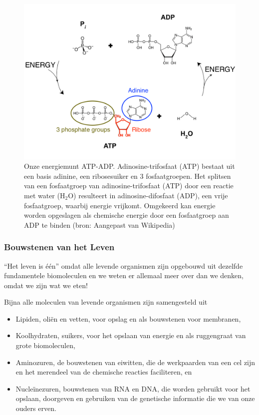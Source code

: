 \documentclass[
  11pt,
]{book}
\providecommand{\tightlist}{%
  \setlength{\itemsep}{0pt}\setlength{\parskip}{0pt}}
\begin{document}
\begin{figure}

{\centering \includegraphics[width=0.7\linewidth]{./figs/ATP-ADP} 

}

\caption{Onze energiemunt ATP-ADP. Adinosine-trifosfaat (ATP) bestaat uit een basis adinine, een ribosesuiker en 3 fosfaatgroepen. Het splitsen van een fosfaatgroep van adinosine-trifosfaat (ATP) door een reactie met water (H\(_2\)O) resulteert in adinosine-difosfaat (ADP), een vrije fosfaatgroep, waarbij energie vrijkomt. Omgekeerd kan energie worden opgeslagen als chemische energie door een fosfaatgroep aan ADP te binden (bron: Aangepast van Wikipedia)}\label{fig:atp-adp}
\end{figure}

\pagebreak

\hypertarget{bouwstenen-van-het-leven}{%
\subsubsection{Bouwstenen van het Leven}\label{bouwstenen-van-het-leven}}

``Het leven is één'' omdat alle levende organismen zijn opgebouwd uit dezelfde fundamentele biomoleculen en we weten er allemaal meer over dan we denken, omdat we zijn wat we eten!

Bijna alle moleculen van levende organismen zijn samengesteld uit

\begin{itemize}
\tightlist
\item
  Lipiden, oliën en vetten, voor opslag en als bouwstenen voor membranen,
\item
  Koolhydraten, suikers, voor het opslaan van energie en als ruggengraat van grote biomoleculen,
\item
  Aminozuren, de bouwstenen van eiwitten, die de werkpaarden van een cel zijn en het merendeel van de chemische reacties faciliteren, en
\item
  Nucleïnezuren, bouwstenen van RNA en DNA, die worden gebruikt voor het opslaan, doorgeven en gebruiken van de genetische informatie die we van onze ouders erven.
\end{itemize}
\end{document}
